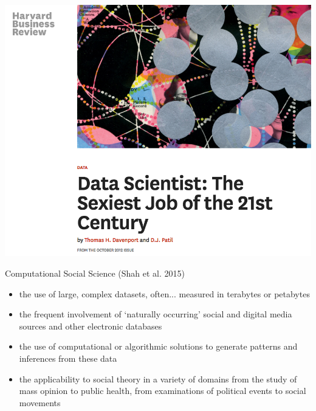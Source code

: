 \documentclass{beamer}
\begin{document}
\begin{frame}[plain]
  \includegraphics[width=\paperwidth]{img/data-science-hbr-sexy.png}
\end{frame}

\begin{frame}{Computational Social Science (Shah et al. 2015)}
  \begin{itemize}[<+->]
    \item the use of large, complex datasets, often... measured in terabytes or petabytes
    \item the frequent involvement of `naturally occurring' social and digital media sources and other electronic databases
    \item the use of computational or algorithmic solutions to generate patterns and inferences from these data
    \item the applicability to social theory in a variety of domains from the study of mass opinion to public health, from examinations of political events to social movements
  \end{itemize}
\end{frame}
\end{document}
